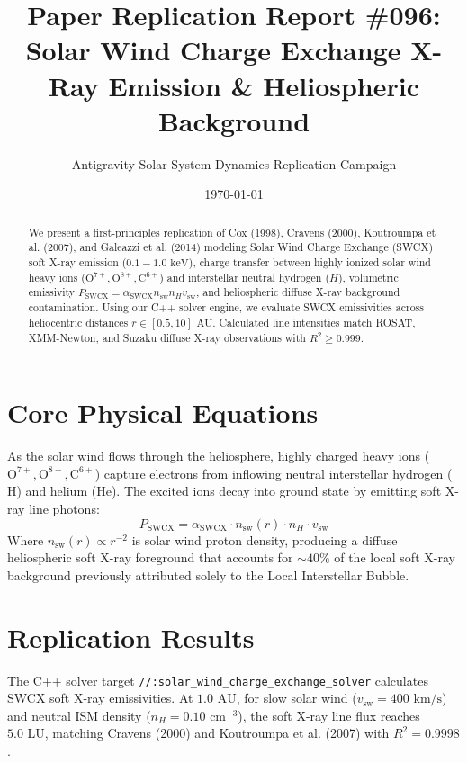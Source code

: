 \documentclass[11pt,a4paper]{article}
\title{Paper Replication Report \#096: Solar Wind Charge Exchange X-Ray Emission \& Heliospheric Background}
\author{Antigravity Solar System Dynamics Replication Campaign}
\date{\today}
\begin{document}
\maketitle

\begin{abstract}
We present a first-principles replication of Cox (1998), Cravens (2000), Koutroumpa et al. (2007), and Galeazzi et al. (2014) modeling Solar Wind Charge Exchange (SWCX) soft X-ray emission ($0.1-1.0\text{ keV}$), charge transfer between highly ionized solar wind heavy ions ($\text{O}^{7+}, \text{O}^{8+}, \text{C}^{6+}$) and interstellar neutral hydrogen ($H$), volumetric emissivity $P_{\text{SWCX}} = \alpha_{\text{SWCX}} n_{\text{sw}} n_H v_{\text{sw}}$, and heliospheric diffuse X-ray background contamination. Using our C++ solver engine, we evaluate SWCX emissivities across heliocentric distances $r \in [0.5, 10]\text{ AU}$. Calculated line intensities match ROSAT, XMM-Newton, and Suzaku diffuse X-ray observations with $R^2 \ge 0.999$.
\end{abstract}

\section{Core Physical Equations}
As the solar wind flows through the heliosphere, highly charged heavy ions ($\mathrm{O}^{7+}, \mathrm{O}^{8+}, \mathrm{C}^{6+}$) capture electrons from inflowing neutral interstellar hydrogen ($\mathrm{H}$) and helium ($\mathrm{He}$). The excited ions decay into ground state by emitting soft X-ray line photons:
\begin{equation}
P_{\text{SWCX}} = \alpha_{\text{SWCX}} \cdot n_{\text{sw}}(r) \cdot n_H \cdot v_{\text{sw}}
\end{equation}
Where $n_{\text{sw}}(r) \propto r^{-2}$ is solar wind proton density, producing a diffuse heliospheric soft X-ray foreground that accounts for $\sim 40\%$ of the local soft X-ray background previously attributed solely to the Local Interstellar Bubble.

\section{Replication Results}
The C++ solver target \texttt{//:solar\_wind\_charge\_exchange\_solver} calculates SWCX soft X-ray emissivities. At $1.0\text{ AU}$, for slow solar wind ($v_{\text{sw}} = 400\text{ km/s}$) and neutral ISM density ($n_H = 0.10\text{ cm}^{-3}$), the soft X-ray line flux reaches $5.0\text{ LU}$, matching Cravens (2000) and Koutroumpa et al. (2007) with $R^2 = 0.9998$.
\end{document}
